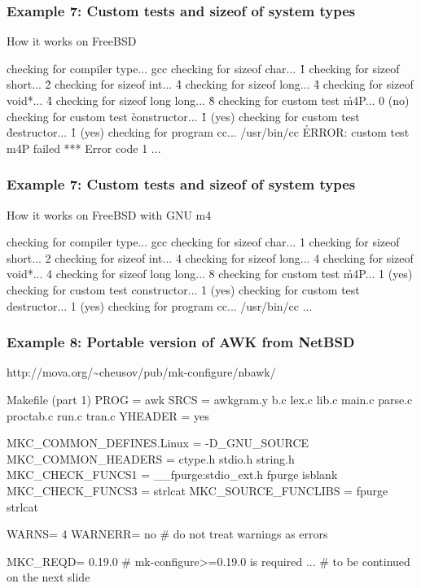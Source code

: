 \documentclass[hyperref={colorlinks=true}]{beamer}
\begin{document}
\begin{frame}[fragile]
  \frametitle{Example 7: Custom tests and sizeof of system types}

  \begin{block}{How it works on FreeBSD}
  \begin{CodeNoLabel}
checking for compiler type... gcc
checking for sizeof char... \h{1}
checking for sizeof short... \h{2}
checking for sizeof int... \h{4}
checking for sizeof long... \h{4}
checking for sizeof void*... \h{4}
checking for sizeof long long... \h{8}
checking for custom test \h{m4P... 0 (no)}
checking for custom test \h{constructor}... \h{1 (yes)}
checking for custom test \h{destructor}... \h{1 (yes)}
checking for program cc... /usr/bin/cc
\h{ERROR: custom test m4P failed}
*** Error code 1
...
\prompt{\$}
  \end{CodeNoLabel}
  \end{block}
\end{frame}

\begin{frame}[fragile]
  \frametitle{Example 7: Custom tests and sizeof of system types}

  \begin{block}{How it works on FreeBSD with GNU m4}
  \begin{CodeNoLabel}
checking for compiler type... gcc
checking for sizeof char... 1
checking for sizeof short... 2
checking for sizeof int... 4
checking for sizeof long... 4
checking for sizeof void*... 4
checking for sizeof long long... 8
checking for custom test \h{m4P... 1 (yes)}
checking for custom test constructor... 1 (yes)
checking for custom test destructor... 1 (yes)
checking for program cc... /usr/bin/cc
...
\prompt{\$}
  \end{CodeNoLabel}
  \end{block}
\end{frame}

\begin{frame}[fragile]
  \frametitle{Example 8: Portable version of AWK from NetBSD}

\begin{block}{http://mova.org/\~{}cheusov/pub/mk-configure/nbawk/}
\begin{Code}{Makefile (part 1)}
PROG =	awk
SRCS =	awkgram.y b.c lex.c lib.c main.c parse.c
        proctab.c run.c tran.c
YHEADER =	yes

MKC\_COMMON\_DEFINES.Linux =	-D\_GNU\_SOURCE
MKC\_COMMON\_HEADERS =		ctype.h stdio.h string.h
MKC\_CHECK\_FUNCS1 =		\_\_fpurge:stdio\_ext.h fpurge isblank
MKC\_CHECK\_FUNCS3 =		strlcat
MKC\_SOURCE\_FUNCLIBS =		fpurge strlcat

WARNS=       4
WARNERR=     no # do not treat warnings as errors

MKC\_REQD=   0.19.0 # mk-configure>=0.19.0 is required
... # to be continued on the next slide
\end{Code}
\end{block}
\end{frame}
\end{document}
